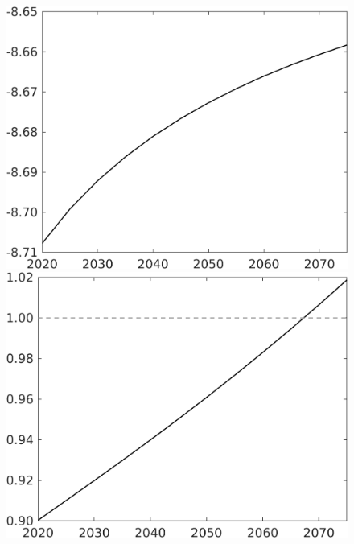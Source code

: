 \documentclass[12pt]{article}
\begin{document}
\begin{figure}[h!!]
\begin{minipage}[]{0.32\textwidth}
	\end{minipage}	
	\begin{minipage}[]{0.32\textwidth}
		\includegraphics[width=1\textwidth]{../../codding_model/own_basedOnFried/optimalPol_010922_revision/figures/all_13Sept22/CompTaul_Equlab_LFBAUPer_Reg0_G_spillover0_nsk0_xgr1_knspil0_sep1_countec0_GovRev0_etaa0.79.png}
	\end{minipage}	
	\begin{minipage}[]{0.32\textwidth}
		\includegraphics[width=1\textwidth]{../../codding_model/own_basedOnFried/optimalPol_010922_revision/figures/all_13Sept22/CompTaul_Equlab_LFBAU_Reg0_lambdaa_spillover0_nsk0_xgr1_knspil0_sep1_countec0_GovRev0_etaa0.79_lgd0.png}

\end{minipage}
\end{figure}
\end{document}
